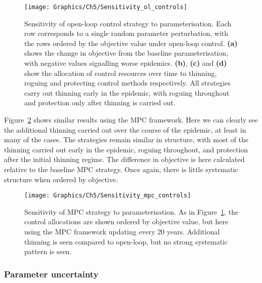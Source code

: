\begin{figure}
    \begin{center}
        \texttt{[image: Graphics/Ch5/Sensitivity\_ol\_controls]}
        \caption[Open-loop control parameter sensitivity]{Sensitivity of open-loop control strategy to parameterisation. Each row corresponds to a single random parameter perturbation, with the rows ordered by the objective value under open-loop control. \textbf{(a)} shows the change in objective from the baseline parameterisation, with negative values signalling worse epidemics. \textbf{(b)}, \textbf{(c)} and \textbf{(d)} show the allocation of control resources over time to thinning, roguing and protecting control methods respectively. All strategies carry out thinning early in the epidemic, with roguing throughout and protection only after thinning is carried out.\label{fig:ch5:ol_sensitivity}}
    \end{center}
\end{figure}

Figure~\ref{fig:ch5:mpc_sensitivity} shows similar results using the MPC framework. Here we can clearly see the additional thinning carried out over the course of the epidemic, at least in many of the cases. The strategies remain similar in structure, with most of the thinning carried out early in the epidemic, roguing throughout, and protection after the initial thinning regime. The difference in objective is here calculated relative to the baseline MPC strategy. Once again, there is little systematic structure when ordered by objective. 

\begin{figure}
    \begin{center}
        \texttt{[image: Graphics/Ch5/Sensitivity\_mpc\_controls]}
        \caption[MPC strategy parameter sensitivity]{Sensitivity of MPC strategy to parameterisation. As in Figure~\ref{fig:ch5:ol_sensitivity}, the control allocations are shown ordered by objective value, but here using the MPC framework updating every 20 years. Additional thinning is seen compared to open-loop, but no strong systematic pattern is seen.\label{fig:ch5:mpc_sensitivity}}
    \end{center}
\end{figure}

\subsubsection{Parameter uncertainty}

